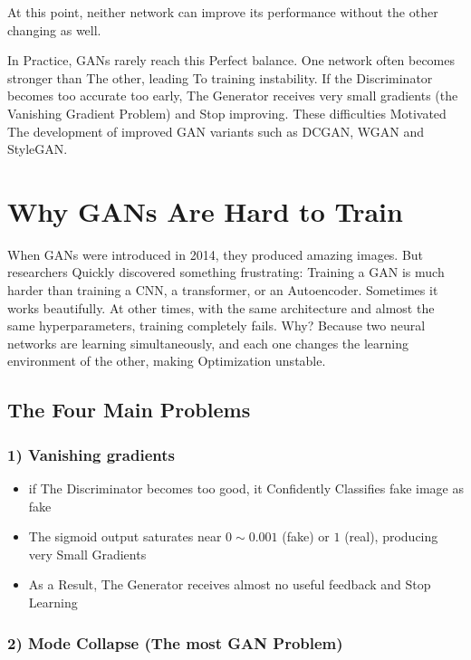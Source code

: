 At this point, neither network can improve its performance without the other changing as well.

In Practice, GANs rarely reach this Perfect balance. One network often becomes stronger than The other, leading To training instability. If the Discriminator becomes too accurate too early, The Generator receives very small gradients (the Vanishing Gradient Problem) and Stop improving. These difficulties Motivated The development of improved GAN variants such as DCGAN, WGAN and StyleGAN.

\section{Why GANs Are Hard to Train}

When GANs were introduced in 2014, they produced amazing images.
But researchers Quickly discovered something frustrating: Training a GAN is much harder than training a CNN, a transformer, or an Autoencoder.
Sometimes it works beautifully. At other times, with the same architecture and almost the same hyperparameters, training completely fails. Why?
Because two neural networks are learning simultaneously, and each one changes the learning environment of the other, making Optimization unstable.

\subsection*{The Four Main Problems}

\subsubsection*{1) Vanishing gradients}
\begin{itemize}
    \item if The Discriminator becomes too good, it Confidently Classifies fake image as fake
    \item The sigmoid output saturates near $0 \sim 0.001$ (fake) or $1$ (real), producing very Small Gradients
    \item As a Result, The Generator receives almost no useful feedback and Stop Learning
\end{itemize}

\subsubsection*{2) Mode Collapse (The most GAN Problem)}


